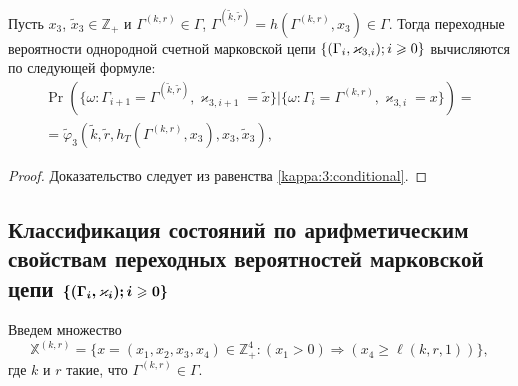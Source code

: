 \documentclass[a4paper,12pt,russian]{extarticle}
\newcommand{\Mark}{\{(\Gamma_i, \varkappa_i); \hm{} i \geqslant 0\}}
\newcommand{\MarkThree}{\{(\Gamma_i, \varkappa_{3,i}); \hm{} i \geqslant 0\}}
\begin{document}
\begin{theorem}
Пусть $x_3$, $\tilde{x}_3\in \mathbb{Z}_+$ и $\Gamma^{(k,r)}\in \Gamma$, $\Gamma^{(\tilde{k},\tilde{r})}=h(\Gamma^{(k,r)},x_3) \in \Gamma$. Тогда переходные вероятности однородной счетной марковской цепи $\MarkThree$ вычисляются по следующей формуле:
\begin{multline}
\Pr (\{\omega\colon\Gamma_{i+1}=\Gamma^{(\tilde{k},\tilde{r})},\varkappa_{3,i+1}=\tilde{x}\}|\{\omega\colon\Gamma_{i}=\Gamma^{(k,r)},\varkappa_{3,i}=x\}) 
= \\ =\widetilde{\varphi}_3(\tilde{k},\tilde{r},h_T(\Gamma^{(k,r)},x_3),x_3,\tilde{x}_3),
\label{transitionToProve:three}
\end{multline}
\end{theorem}
\begin{proof}
Доказательство следует из равенства \eqref{kappa:3:conditional}.
\end{proof}



\subsection[Классификация состояний по арифметическим свойствам переходных вероятностей марковской цепи $\boldsymbol{\Mark}$]%
{Классификация состояний по арифметическим \\ свойствам переходных вероятностей марковской цепи $\boldsymbol{\Mark}$}
Введем множество 
\begin{equation*}
{\mathbb X}^{(k,r)} = \{x = (x_1,x_2,x_3,x_4) \in \mathbb{Z}_+^4 \colon (x_1 > 0) \Rightarrow (x_4 \geqslant \ell(k,r,1))\},
\end{equation*}
где $k$ и $r$ такие, что $\Gamma^{(k,r)}\in \Gamma$. 
\end{document}
